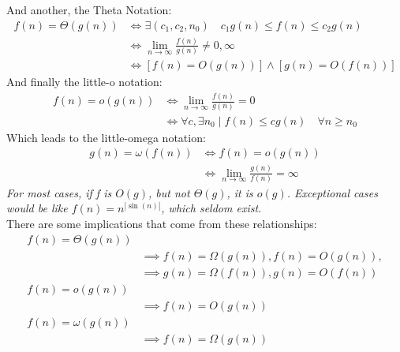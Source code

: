 \documentclass[nobib]{tufte-handout}
\begin{document}
And another, the Theta Notation:
\begin{align*}
    f(n)=\Theta(g(n)) & \iff \exists(c_1,c_2,n_0)\quad c_1g(n)\leq f(n)\leq c_2g(n)  \\
                      & \iff \lim_{n\rightarrow\infty}\frac{f(n)}{g(n)}\neq 0,\infty \\
                      & \iff [f(n) = O(g(n))] \land [g(n) = O(f(n))]
\end{align*}
And finally the little-o notation:
\begin{align*}
    f(n) = o(g(n)) & \iff \lim_{n\rightarrow\infty}\frac{f(n)}{g(n)} = 0                    \\
                   & \iff \forall c,\exists n_0 \mid f(n)\leq cg(n) \quad \forall n\geq n_0
\end{align*}
Which leads to the little-omega notation:
\begin{align*}
    g(n) = \omega(f(n)) & \iff f(n) = o(g(n))                                      \\
                        & \iff \lim_{n\rightarrow\infty}\frac{g(n)}{f(n)} = \infty
\end{align*}
\textit{For most cases, if f is $O(g)$, but not $\Theta(g)$, it is $o(g)$. Exceptional cases would be like $f(n) = n^{|\sin(n)|}$, which seldom exist.}\\
There are some implications that come from these relationships:
\begin{align*}
    f(n) = \Theta(g(n)) &                                              \\
                        & \implies f(n) = \Omega(g(n)), f(n)= O(g(n)), \\
                        & \implies g(n) =\Omega(f(n)), g(n) = O(f(n))  \\
    f(n) = o(g(n))      &                                              \\
                        & \implies f(n) = O(g(n))                      \\
    f(n) = \omega(g(n)) &                                              \\
                        & \implies f(n) = \Omega(g(n))
\end{align*}
\end{document}
